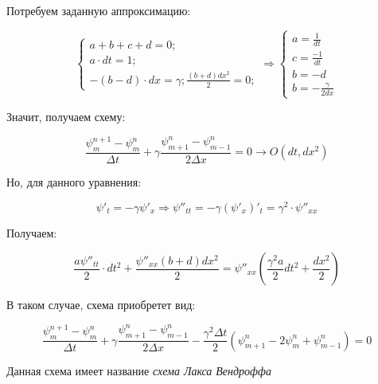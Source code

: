 \documentclass[10pt,a4paper]{article}
\begin{document}
	Потребуем заданную аппроксимацию:
	
	\begin{equation}
		\begin{cases}
			a + b + c + d = 0;
			\\
			a\cdot dt = 1;
			\\
			-\left(b - d\right)\cdot dx = \gamma;
			\frac{\left(b + d\right)dx^{2}}{2} = 0;
		\end{cases}
		\Rightarrow 
		\begin{cases}
			a = \frac{1}{dt}
			\\
			c = \frac{-1}{dt}
			\\
			b = -d
			\\
			b = -\frac{\gamma}{2dx}
		\end{cases}
	\end{equation}
	
	Значит, получаем схему:
	
	\begin{equation}
		\frac{\psi_{m}^{n + 1} - \psi_{m}^{n}}{\Delta t} + \gamma
		\frac{\psi^{n}_{m + 1} - \psi^{n}_{m - 1}}{2\Delta x} = 0 \rightarrow 
		O\left(dt, dx^{2}\right)
	\end{equation}
	
	Но, для данного уравнения:
	
	\begin{equation}
		\psi'_{t} = -\gamma\psi'_{x} \Rightarrow \psi''_{tt} = -\gamma
		\left(\psi'_{x}\right)'_{t} = \gamma^{2}\cdot\psi''_{xx}
	\end{equation}
	
	Получаем:
	
	\begin{equation}
		\frac{a\psi''_{tt}}{2}\cdot dt^{2} + \frac{\psi''_{xx}\left(b + d
		\right)dx^{2}}{2} = \psi''_{xx}\left(\frac{\gamma^{2} a}{2}dt^{2} + 
		\frac{dx^{2}}{2}\right)
	\end{equation}
	
	В таком случае, схема приобретет вид:
	
	\begin{equation}
		\frac{\psi^{n + 1}_{m} - \psi^{n}_{m}}{\Delta t} + 
		\gamma\frac{\psi^{n}_{m + 1} - \psi^{n}_{m - 1}}{2\Delta x} - 
		\frac{\gamma^{2}\Delta t}{2}\left(\psi^{n}_{m + 1} - 2\psi_{m}^{n} + 
		\psi_{m - 1}^{n}\right) = 0
	\end{equation}
	
	Данная схема имеет название \textit{схема Лакса Вендроффа}
\end{document}
